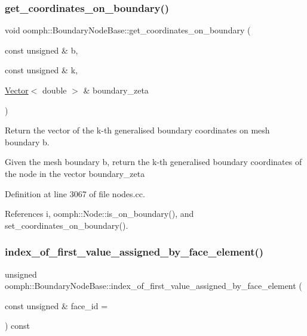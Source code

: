 \subsubsection{\texorpdfstring{get\+\_\+coordinates\+\_\+on\+\_\+boundary()}{get\_coordinates\_on\_boundary()}\hspace{0.1cm}{\footnotesize\ttfamily [2/2]}}
{\footnotesize\ttfamily void oomph\+::\+Boundary\+Node\+Base\+::get\+\_\+coordinates\+\_\+on\+\_\+boundary (\begin{DoxyParamCaption}\item[{const unsigned \&}]{b,  }\item[{const unsigned \&}]{k,  }\item[{\hyperlink{classoomph_1_1Vector}{Vector}$<$ double $>$ \&}]{boundary\+\_\+zeta }\end{DoxyParamCaption})}



Return the vector of the k-\/th generalised boundary coordinates on mesh boundary b. 

Given the mesh boundary b, return the k-\/th generalised boundary coordinates of the node in the vector boundary\+\_\+zeta 

Definition at line 3067 of file nodes.\+cc.



References i, oomph\+::\+Node\+::is\+\_\+on\+\_\+boundary(), and set\+\_\+coordinates\+\_\+on\+\_\+boundary().

\mbox{\label{classoomph_1_1BoundaryNodeBase_a67c470bd15750e91775101b5bce65a58}} 
\subsubsection{\texorpdfstring{index\+\_\+of\+\_\+first\+\_\+value\+\_\+assigned\+\_\+by\+\_\+face\+\_\+element()}{index\_of\_first\_value\_assigned\_by\_face\_element()}\hspace{0.1cm}{\footnotesize\ttfamily [1/2]}}
{\footnotesize\ttfamily unsigned oomph\+::\+Boundary\+Node\+Base\+::index\+\_\+of\+\_\+first\+\_\+value\+\_\+assigned\+\_\+by\+\_\+face\+\_\+element (\begin{DoxyParamCaption}\item[{const unsigned \&}]{face\+\_\+id = {} }\end{DoxyParamCaption}) const\hspace{0.3cm}{\ttfamily [inline]}}



